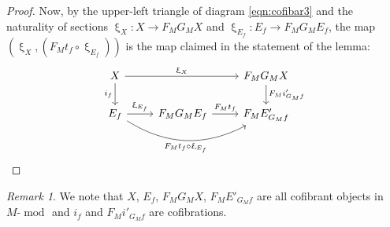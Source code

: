 \documentclass{article}
\newcommand{\module}[2][]{#2\text{-}\modop_{#1}}
\DeclareMathOperator{\modop}{mod}
\theoremstyle{definition}
\theoremstyle{remark}
\newtheorem{remark}[theorem]{Remark}
\begin{document}
\begin{proof}
Now, by the upper-left triangle of diagram \eqref{eqn:cofibar3} and the naturality of sections
$\upxi_{X} \colon X \rightarrow F_{M}G_{M}X$ and $\upxi_{E_{f}} \colon E_{f} \rightarrow F_{M}G_{M}E_{f}$, 
the map $(\upxi_{X},(F_{M}t_{f}\circ \upxi_{E_{f}}))$ is the map claimed in the statement of the lemma:
\begin{equation}
    \begin{tikzcd}
       X \arrow[rr, "\upxi_{X}"]  \arrow[d, "i_{f}"'] & & F_{M}G_{M}X \arrow[d, "F_{M}i'_{G_{M}f}"] \\
       E_{f} \arrow[r, "\upxi_{E_{f}}"] 
       \arrow[rr, bend right, "F_M t_f \circ \upxi_{E_f}"'] & F_M G_M E_f \arrow[r, "F_{M}t_{f}"] & F_{M} E'_{G_{M}f}
     \end{tikzcd}
\end{equation} 
\end{proof}

\begin{remark}
We note that $X$, $E_{f}$, $F_{M}G_{M}X$, $F_{M}E'_{G_{M}f}$ are all cofibrant objects in $\module{M}$
and $i_{f}$ and $F_{M}i'_{G_{M}f}$ are cofibrations.
\end{remark}
\end{document}
